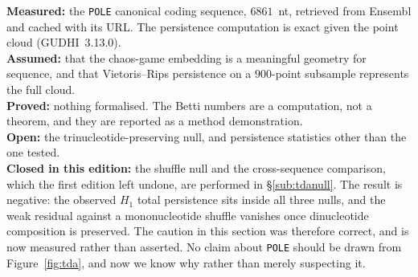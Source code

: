 \begin{ledger}
\textbf{Measured:} the \texttt{POLE} canonical coding sequence, $6861$~nt,
retrieved from Ensembl and cached with its URL. The persistence computation is
exact given the point cloud (GUDHI~3.13.0). \\
\textbf{Assumed:} that the chaos-game embedding is a meaningful geometry for
sequence, and that Vietoris--Rips persistence on a $900$-point subsample
represents the full cloud. \\
\textbf{Proved:} nothing formalised. The Betti numbers are a computation, not a
theorem, and they are reported as a method demonstration. \\
\textbf{Open:} the trinucleotide-preserving null, and persistence statistics
other than the one tested. \\
\textbf{Closed in this edition:} the shuffle null and the cross-sequence
comparison, which the first edition left undone, are performed in
\S\ref{sub:tdanull}. The result is negative: the observed $H_1$ total
persistence sits inside all three nulls, and the weak residual against a
mononucleotide shuffle vanishes once dinucleotide composition is preserved. The
caution in this section was therefore correct, and is now measured rather than
asserted. No claim about \texttt{POLE} should be drawn from
Figure~\ref{fig:tda}, and now we know why rather than merely suspecting it.
\end{ledger}
